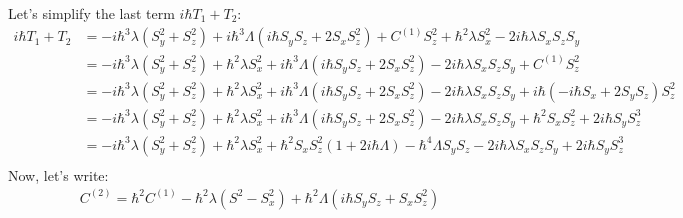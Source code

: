 \documentclass[11pt,a4paper]{article}
\begin{document}
 Let's simplify the last term $i  \hbar T_1 +  T_2$:
 \begin{align*}
 i  \hbar T_1 +  T_2 &= - i \hbar^3 \lambda (S_y^2 + S_z^2) +  i \hbar^3 \Lambda  ( i \hbar S_y S_z+ 2 S_x S_z^2) +  C^{(1)}S_z^2 + \hbar^2  \lambda  S_x^2  - 2 i \hbar  \lambda  S_x S_z S_y \\
 &= - i \hbar^3 \lambda (S_y^2 + S_z^2)   + \hbar^2  \lambda  S_x^2 + i \hbar^3 \Lambda  ( i \hbar S_y S_z+ 2 S_x S_z^2) - 2 i \hbar  \lambda  S_x S_z S_y +  C^{(1)}S_z^2 \\
 &= - i \hbar^3 \lambda (S_y^2 + S_z^2)   + \hbar^2  \lambda  S_x^2 + i \hbar^3 \Lambda  ( i \hbar S_y S_z+ 2 S_x S_z^2) - 2 i \hbar  \lambda  S_x S_z S_y +  i \hbar (- i \hbar S_x +  2 S_y S_z) S_z^2 \\
  &= - i \hbar^3 \lambda (S_y^2 + S_z^2)   + \hbar^2  \lambda  S_x^2 + i \hbar^3 \Lambda  ( i \hbar S_y S_z+ 2 S_x S_z^2) - 2 i \hbar  \lambda  S_x S_z S_y +  \hbar^2 S_x S_z^2 +  2  i \hbar S_y  S_z^3 \\
   &= - i \hbar^3 \lambda (S_y^2 + S_z^2)   + \hbar^2  \lambda  S_x^2 +  \hbar^2 S_x S_z^2 (1+ 2 i \hbar \Lambda)  - \hbar^4 \Lambda  S_y S_z - 2 i \hbar  \lambda  S_x S_z S_y   +  2  i \hbar S_y  S_z^3 \\
 \end{align*}
 Now, let's write:
 \begin{align*}
   C^{(2)}= \hbar^2 C^{(1)}  -  \hbar^2 \lambda (S^2 - S_x^2)  + \hbar^2 \Lambda  ( i \hbar S_y S_z+  S_x S_z^2)
 \end{align*}



 


%
\end{document}
